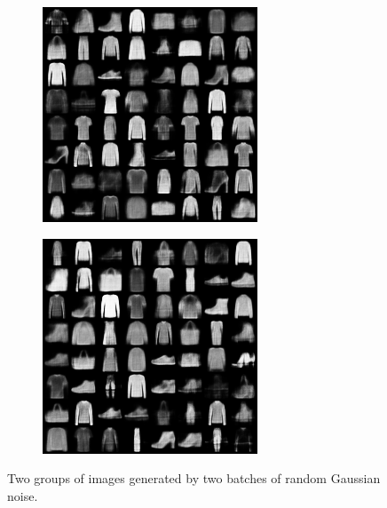 \begin{figure}[htbp]
    \centering
    \begin{subfigure}
        \centering
        \includegraphics[width=0.45\linewidth]{../images/vae-image1.png}
        \label{fig:vae_image1}
    \end{subfigure}
    \begin{subfigure}
        \centering
        \includegraphics[width=0.45\linewidth]{../images/vae-image2.png}
        \label{fig:vae_image2}
    \end{subfigure}
    
    \caption{Two groups of images generated by two batches of random Gaussian noise.}
    \label{fig:vae_original_image}
\end{figure}

